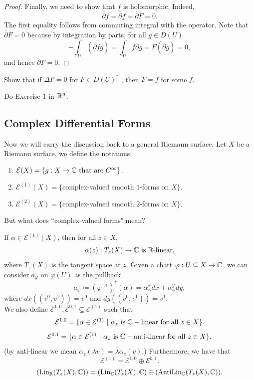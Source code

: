 \documentclass{article}
\begin{document}
{\begin{proof}
    Finally, we need to show that $f$ is holomorphic. Indeed, 
    \[\underline{\overline{\partial} f} = \overline{\partial} \underline{f} = \overline{\partial} F = 0.\]
    The first equality follows from commuting integral with the operator. Note that $\overline{\partial} F = 0$ because by integration by parts, for all $g \in D(U)$
    \[- \int_{U} (\overline{\partial f} g) = \int_{U} f \overline{\partial} g = F(\overline{\partial} g) = 0,\]
    and hence $\overline{\partial} F = 0$.
\end{proof}

\begin{exercise}
    Show that if $\Delta F = 0$ for $F \in D(U)^*$ , then $F = \underline{f}$ for some $f$.
\end{exercise}

\begin{exercise}
    Do Exercise $1$ in $\mathbb{R}^n$.
\end{exercise}

\subsection{Complex Differential Forms}

Now we will carry the discussion back to a general Riemann surface. Let $X$ be a Riemann surface, we define the notations:
\begin{enumerate}
    \item $\mathcal{E}(X) = \{g: X \to \mathbb{C} \text{ that are } C^\infty\}$.
    \item $\mathcal{E}^{(1)}(X) = \{$complex-valued smooth $1$-forms on $X\}$.
    \item $\mathcal{E}^{(2)}(X) = \{$complex-valued smooth $2$-forms on $X\}$.
\end{enumerate}

But what does ``complex-valued forms" mean?
\begin{definition}
    If $\alpha \in \mathcal{E}^{(1)}(X)$, then for all $z \in X$,
    \[\alpha(z): T_z(X) \to \mathbb{C} \text{ is $\mathbb{R}$-linear},\]
    where $T_z(X)$ is the tangent space at $z$. Given a chart $\varphi: U \subseteq X \to \mathbb{C}$, we can consider $a_\varphi$ on $\varphi(U)$ as the pullback
    \[a_\varphi \coloneqq (\varphi^{-1})^*(\alpha) = \alpha^x_{\varphi} dx + \alpha^y_{\varphi} dy, \]
    where $dx((v^0, v^1)) = v^0$ and $dy((v^0, v^1)) = v^1$.\\

    We also define $\mathcal{E}^{1, 0}, \mathcal{E}^{0, 1} \subseteq \mathcal{E}^{(1)}$ such that
    \[\mathcal{E}^{1, 0} = \{\alpha \in \mathcal{E}^{(1)}\ |\ \alpha_z \text{ is } \mathbb{C}-\text{linear for all $z \in X$}\}.\]
     \[\mathcal{E}^{0,1} = \{\alpha \in \mathcal{E}^{(1)}\ |\ \alpha_z \text{ is } \mathbb{C}-\text{anti-linear for all $z \in X$}\}.\]
     (by anti-linear we mean $\alpha_z(\lambda v) = \overline{\lambda} \alpha_z(v)$.) Furthermore, we have that
     \[\mathcal{E}^{(1)} = \mathcal{E}^{1, 0} \oplus \mathcal{E}^{0, 1}.\]
     \[(\operatorname{Lin}_{\mathbb{R}}(T_z(X), \mathbb{C})) = (\operatorname{Lin}_{\mathbb{C}}(T_z(X), \mathbb{C}) \oplus (\operatorname{AntiLin}_{\mathbb{C}}(T_z(X), \mathbb{C})).\]


\end{definition}}
\end{document}
